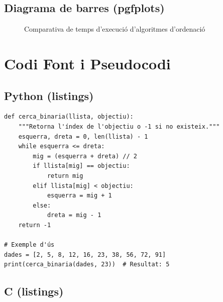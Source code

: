 \documentclass[informe, catalan]{practicaitic}
\theoremstyle{definition}
\theoremstyle{remark}
\begin{document}
\subsection{Diagrama de barres (pgfplots)}

\begin{figure}[H]
\centering
{}
\caption{Comparativa de temps d'execució d'algoritmes d'ordenació}
\label{fig:barres}
\end{figure}


\section{Codi Font i Pseudocodi}

\subsection{Python (listings)}

\begin{lstlisting}[style=python, caption={Cerca binària en Python}, label=cod:binsearch]
def cerca_binaria(llista, objectiu):
    """Retorna l'índex de l'objectiu o -1 si no existeix."""
    esquerra, dreta = 0, len(llista) - 1
    while esquerra <= dreta:
        mig = (esquerra + dreta) // 2
        if llista[mig] == objectiu:
            return mig
        elif llista[mig] < objectiu:
            esquerra = mig + 1
        else:
            dreta = mig - 1
    return -1

# Exemple d'ús
dades = [2, 5, 8, 12, 16, 23, 38, 56, 72, 91]
print(cerca_binaria(dades, 23))  # Resultat: 5
\end{lstlisting}

\subsection{C (listings)}
\end{document}
